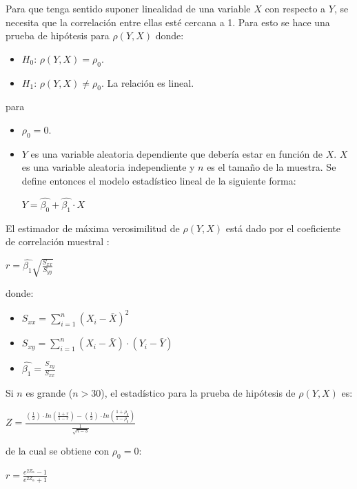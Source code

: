     Para que tenga sentido suponer linealidad de una variable $X$
con respecto a $Y$, se necesita que la correlación entre ellas esté
cercana a 1. Para esto se hace una prueba de hipótesis para $\rho(Y, X)$ donde:
\begin{itemize}
    \item $H_0$: $\rho(Y, X) = \rho_0$.
    \item $H_1$: $\rho(Y, X) \neq \rho_0$. La relación es lineal.
\end{itemize}
para
\begin{itemize}
    \item $\rho_0 = 0$.
    \item $Y$ es una variable aleatoria dependiente que debería estar
en función de $X$. $X$ es una variable aleatoria independiente y $n$
es el tamaño de la muestra. Se define entonces el modelo estadístico
lineal de la siguiente forma:
        \begin{center}
            $Y = \hat{\beta_0} + \hat{\beta_1} \cdot X$
        \end{center}
\end{itemize}

    El estimador de máxima verosimilitud de $\rho(Y, X)$ está
dado por el coeficiente de correlación muestral \cite{AB_0}:
\begin{center}
    $r = \hat{\beta_1}\displaystyle\sqrt{\frac{S_{xx}}{S_{yy}}}$
\end{center}
donde:
\begin{itemize}
    \item $S_{xx} = \displaystyle\sum_{i = 1}^n (X_i - \bar{X})^2$
    \item $S_{xy} = \displaystyle\sum_{i = 1}^n (X_i - \bar{X}) \cdot (Y_i - \bar{Y})$
    \item $\hat{\beta_1} = \displaystyle\frac{S_{xy}}{S_{xx}}$
\end{itemize}

    Si $n$ es grande ($n > 30$), el estadístico para la prueba de hipótesis de
$\rho(Y, X)$ es:
\begin{center}
$Z = \displaystyle\frac{\left( \displaystyle\frac{1}{2} \right) \cdot ln\left( \displaystyle\frac{1 + r}{1 - r} \right) - \left( \displaystyle\frac{1}{2} \right) \cdot ln\left( \displaystyle\frac{1 + \rho_0}{1 - \rho_0} \right)}{\displaystyle\frac{1}{\sqrt{n - 3}}}$
\end{center}
de la cual se obtiene con $\rho_0 = 0$:
\begin{center}
    $r = \displaystyle\frac{e^{2 Z_{\alpha}} - 1}{e^{2 Z_{\alpha}} + 1}$
\end{center}

